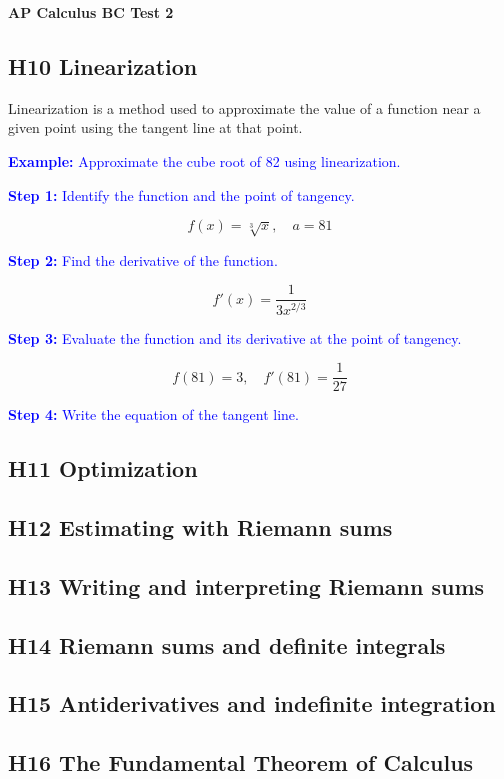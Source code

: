 \documentclass[letterpaper, 12pt]{article}
\newcommand{\example}[1]{\textcolor{blue}{\textbf{Example:} #1}}
\newcommand{\step}[2]{\textcolor{blue}{\textbf{Step #1:} #2}}
\begin{document}
\begin{center}
\textbf{{\Large AP Calculus BC Test 2}}
\end{center}

\subsection*{H10 Linearization}

Linearization is a method used to approximate the value of a function near a given point using the tangent line at that point. 

\example{Approximate the cube root of 82 using linearization.}

\step{1}{Identify the function and the point of tangency.}

$$f(x) = \sqrt[3]{x}, \quad a = 81$$

\step{2}{Find the derivative of the function.}

$$f'(x) = \frac{1}{3x^{2/3}}$$

\step{3}{Evaluate the function and its derivative at the point of tangency.}

$$f(81) = 3, \quad f'(81) = \frac{1}{27}$$

\step{4}{Write the equation of the tangent line.}

\subsection*{H11 Optimization}

\subsection*{H12 Estimating with Riemann sums}

\subsection*{H13 Writing and interpreting Riemann sums}

\subsection*{H14 Riemann sums and definite integrals}

\subsection*{H15 Antiderivatives and indefinite integration}

\subsection*{H16 The Fundamental Theorem of Calculus}
\end{document}
